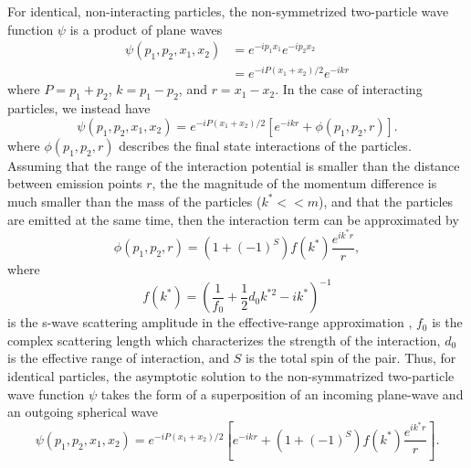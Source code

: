 For identical, non-interacting particles, the non-symmetrized two-particle wave function $\psi$ is a product of plane waves
\begin{equation}
\begin{split}
\psi(p_1, p_2, x_1, x_2) & = e^{-ip_1x_1}e^{-ip_2x_2} \\
& = e^{-i P(x_1 + x_2)/2}e^{-ikr}
\end{split}
\end{equation}
where $P = p_1 + p_2$, $k = p_1 - p_2$, and $r = x_1 - x_2$.
In the case of interacting particles, we instead have
\begin{equation}
\psi(p_1, p_2, x_1, x_2) = e^{-i P(x_1 + x_2)/2} \left[ e^{-ikr} + \phi(p_1, p_2, r) \right].
\end{equation}
where $\phi(p_1, p_2, r)$ describes the final state interactions of the particles.
Assuming that the range of the interaction potential is smaller than the distance between emission points $r$, the the magnitude of the momentum difference is much smaller than the mass of the particles ($k^* << m$), and that the particles are emitted at the same time, then the interaction term can be approximated \cite{lednicky82} by
\begin{equation}
\label{eq:InteractionTerm}
\phi(p_1, p_2, r) = (1 + (-1)^S)f(k^*)\frac{e^{ik^*r}}{r},
\end{equation}
where 
\begin{equation}
\label{eq:ScatteringAmplitude}
f(k^*) = \left(\frac{1}{f_0} + \frac{1}{2}d_0k^{*2}-ik^*\right)^{-1}
\end{equation}
is the s-wave scattering amplitude in the effective-range approximation \cite{LANDAU1977502}, $f_0$ is the complex scattering length which characterizes the strength of the interaction, $d_0$ is the effective range of interaction, and $S$ is the total spin of the pair.
Thus, for identical particles, the asymptotic solution to the non-symmatrized two-particle wave function $\psi$ takes the form of a superposition of an incoming plane-wave and an outgoing spherical wave
\begin{equation}
\label{eq:swaveScattering}
\psi(p_1, p_2, x_1, x_2) = e^{-i P(x_1 + x_2)/2} \left[ e^{-ikr} + (1 + (-1)^S)f(k^*)\frac{e^{ik^*r}}{r}\right].
\end{equation}


